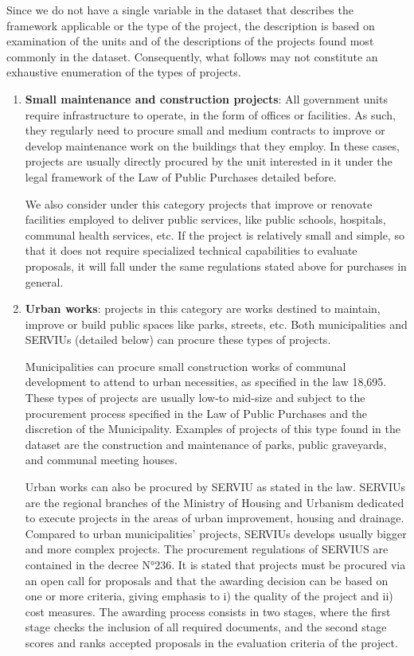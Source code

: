Since we do not have a single variable in the dataset that describes the framework applicable or the type of the project, the description is based on examination of the units and of the descriptions of the projects found most commonly in the dataset. Consequently, what follows may not constitute an exhaustive enumeration of the types of projects.

\begin{enumerate}[wide, labelwidth=!,labelindent=0pt,label=\textbf{\arabic*}.]
\item \textbf{Small maintenance and construction projects}:
All government units require infrastructure to operate, in the form of offices or facilities. As such, they regularly need to procure small and medium contracts to improve or develop maintenance work on the buildings that they employ. In these cases, projects are usually directly procured by the unit interested in it under the legal framework of the Law of Public Purchases detailed before.

We also consider under this category projects that improve or renovate facilities employed to deliver public services, like public schools, hospitals, communal health services, etc. If the project is relatively small and simple, so that it does not require specialized technical capabilities to evaluate proposals, it will fall under the same regulations stated above for purchases in general.

\item \textbf{Urban works}: projects in this category are works destined to maintain, improve or build public spaces like parks, streets, etc. Both municipalities and SERVIUs (detailed below) can procure these types of projects.

Municipalities can procure small construction works of communal development to attend to urban necessities, as specified in the law 18,695. These types of projects are usually low-to mid-size and subject to the procurement process specified in the Law of Public Purchases and the discretion of the Municipality. Examples of projects of this type found in the dataset are the construction and maintenance of parks, public graveyards, and communal meeting houses.

Urban works can also be procured by SERVIU as stated in the law. SERVIUs are the regional branches of the Ministry of Housing and Urbanism dedicated to execute projects in the areas of urban improvement, housing and drainage. Compared to urban municipalities' projects, SERVIUs develops usually bigger and more complex projects. The procurement regulations of SERVIUS are contained in the decree N°236. It is stated that projects must be procured via an open call for proposals and that the awarding decision can be based on one or more criteria, giving emphasis to i) the quality of the project and ii) cost measures. The awarding process consists in two stages, where the first stage checks the inclusion of all required documents, and the second stage scores and ranks accepted proposals in the evaluation criteria of the project.


\end{enumerate}

